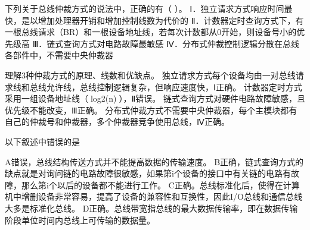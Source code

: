 \question 下列关于总线仲裁方式的说法中，正确的有（ ）。
Ⅰ．独立请求方式响应时间最快，是以增加处理器开销和增加控制线数为代价的
Ⅱ．计数器定时查询方式下，有一根总线请求（BR）和一根设备地址线，若每次计数都从0开始，则设备号小的优先级高
Ⅲ．链式查询方式对电路故障最敏感
Ⅳ．分布式仲裁控制逻辑分散在总线各部件中，不需要中央仲裁器
\par{}
\begin{solution}理解3种仲裁方式的原理、线数和优缺点。
独立请求方式每个设备均由一对总线请求线和总线允许线，总线控制逻辑复杂，但响应速度快，Ⅰ正确。
计数器定时方式采用一组设备地址线（log2(n)），Ⅱ错误。
链式查询方式对硬件电路故障敏感，且优先级不能改变，Ⅲ正确。
分布式仲裁方式不需要中央仲裁器，每个主模块都有自己的仲裁号和仲裁器，多个仲裁器竞争使用总线，Ⅳ正确。
\end{solution}
\question 以下叙述中错误的是
\par{}
\begin{solution}A错误，总线结构传送方式并不能提高数据的传输速度。
B正确，链式查询方式的缺点就是对询问链的电路故障很敏感，如果第i个设备的接口中有关链的电路有故障，那么第i个以后的设备都不能进行工作。
C正确。总线标准化后，使得在计算机中增删设备非常容易，提高了设备的兼容性和互换性，因此I/O总线和通信总线大多是标准化总线。
D正确。总线带宽指总线的最大数据传输率，即在数据传输阶段单位时间内总线上可传输的数据量。
\end{solution}

